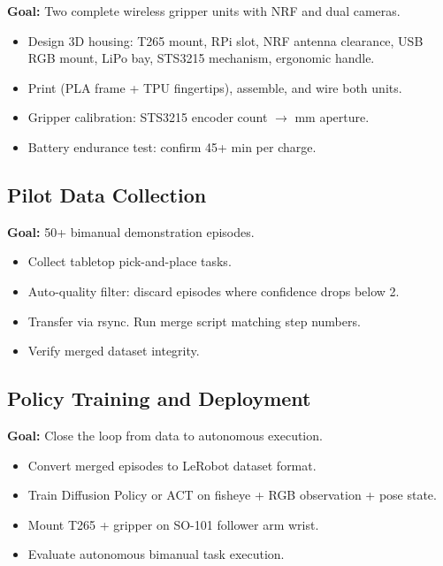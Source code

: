 \documentclass[11pt,a4paper]{article}
\begin{document}
\textbf{Goal:} Two complete wireless gripper units with NRF and dual cameras.

\begin{itemize}[label=$\square$]
  \item Design 3D housing: T265 mount, RPi slot, NRF antenna clearance, USB RGB mount, LiPo bay, STS3215 mechanism, ergonomic handle.
  \item Print (PLA frame + TPU fingertips), assemble, and wire both units.
  \item Gripper calibration: STS3215 encoder count $\to$ mm aperture.
  \item Battery endurance test: confirm 45+ min per charge.
\end{itemize}

\subsection{Pilot Data Collection}

\textbf{Goal:} 50+ bimanual demonstration episodes.

\begin{itemize}[label=$\square$]
  \item Collect tabletop pick-and-place tasks.
  \item Auto-quality filter: discard episodes where confidence drops below 2.
  \item Transfer via rsync. Run merge script matching step numbers.
  \item Verify merged dataset integrity.
\end{itemize}

\subsection{Policy Training and Deployment}

\textbf{Goal:} Close the loop from data to autonomous execution.

\begin{itemize}[label=$\square$]
  \item Convert merged episodes to LeRobot dataset format.
  \item Train Diffusion Policy or ACT on fisheye + RGB observation + pose state.
  \item Mount T265 + gripper on SO-101 follower arm wrist.
  \item Evaluate autonomous bimanual task execution.
\end{itemize}
\end{document}
